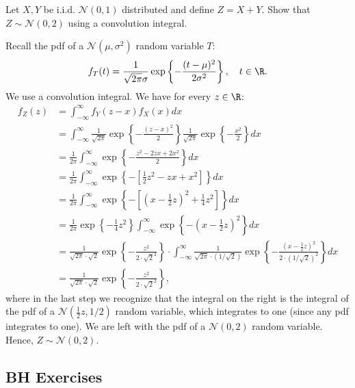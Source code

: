 \begin{exercise}
Let $X,Y$ be i.i.d.
$\mathcal{N}(0,1)$ distributed and define $Z = X + Y$.
Show that $Z \sim \mathcal{N}(0,2)$ using a convolution integral.
\begin{solution}
Recall the pdf of a $\mathcal{N}(\mu,\sigma^2)$ random variable $T$:
\begin{align}
    f_T(t) = \frac{1}{\sqrt{2\pi}\sigma} \exp\left\{-\frac{(t-\mu)^2}{2 \sigma^2}\right\}, \quad t \in \R.
\end{align}
We use a convolution integral. We have for every $z \in \R$:
\begin{align}
    f_Z(z) &= \int_{-\infty}^\infty f_Y(z - x) f_X(x) dx \\
    &= \int_{-\infty}^\infty \frac{1}{\sqrt{2\pi}} \exp\left\{-\frac{(z - x)^2}{2}\right\} \frac{1}{\sqrt{2\pi}} \exp\left\{-\frac{x^2}{2 }\right\} dx \\
    &= \frac{1}{2\pi} \int_{-\infty}^\infty  \exp\left\{-\frac{z^2 - 2zx + 2 x^2}{2}\right\} dx \\
    &= \frac{1}{2\pi} \int_{-\infty}^\infty  \exp\left\{-\left[\frac{1}{2}z^2 - zx +  x^2\right]\right\} dx \\
    &= \frac{1}{2\pi} \int_{-\infty}^\infty  \exp\left\{-\left[\left(x - \frac{1}{2}z\right)^2 + \frac{1}{4}z^2\right]\right\} dx \\
    &= \frac{1}{2\pi} \exp\left\{-\frac{1}{4}z^2\right\} \int_{-\infty}^\infty  \exp\left\{-\left(x - \frac{1}{2}z\right)^2\right\} dx \\
    &= \frac{1}{\sqrt{2\pi} \cdot \sqrt{2}} \exp\left\{-\frac{z^2}{2 \cdot \sqrt{2}^2}\right\} \cdot \int_{-\infty}^\infty  \frac{1}{\sqrt{2\pi} \cdot (1/\sqrt{2})} \exp\left\{-\frac{\left(x - \tfrac{1}{2}z\right)^2}{2 \cdot (1/\sqrt{2})^2}\right\} dx \\
    &= \frac{1}{\sqrt{2\pi} \cdot \sqrt{2}} \exp\left\{-\frac{z^2}{2 \cdot \sqrt{2}^2}\right\},
\end{align}
where in the last step we recognize that the integral on the right is the integral of the pdf of a $\mathcal{N}(\tfrac{1}{2}z, 1/2)$ random variable, which integrates to one (since any pdf integrates to one). We are left with the pdf of a $\mathcal{N}(0,2)$ random variable. Hence, $Z \sim \mathcal{N}(0,2)$.
\end{solution}
\end{exercise}


\subsection{BH Exercises}
\label{sec:bh-exercises-1}

